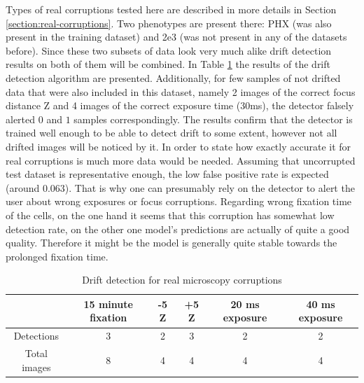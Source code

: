 Types of real corruptions tested here are described in more details in Section \ref{section:real-corruptions}. Two phenotypes are present there: PHX (was also present in the training dataset) and 2e3 (was not present in any of the datasets before). Since these two subsets of data look very much alike drift detection results on both of them will be combined. In Table \ref{table:real-corruptions-dd} the results of the drift detection algorithm are presented. Additionally, for few samples of not drifted data that were also included in this dataset, namely 2 images of the correct focus distance Z and 4 images of the correct exposure time (30ms), the detector falsely alerted $0$ and $1$ samples correspondingly. The results confirm that the detector is trained well enough to be able to detect drift to some extent, however not all drifted images will be noticed by it. In order to state how exactly accurate it for real corruptions is much more data would be needed. Assuming that uncorrupted test dataset is representative enough, the low false positive rate is expected (around $0.063$). That is why one can presumably rely on the detector to alert the user about wrong exposures or focus corruptions. Regarding wrong fixation time of the cells, on the one hand it seems that this corruption has somewhat low detection rate, on the other one model's predictions are actually of quite a good quality. Therefore it might be the model is generally quite stable towards the prolonged fixation time.

\begin{table}[htb]
    \centering
    \caption{Drift detection for real microscopy corruptions}
        \begin{adjustbox}{width=\textwidth}
            \begin{tabular}{|c||c|c|c|c|c|}\hline
				
                &15 minute fixation
                &-5 Z
                &+5 Z
                &20 ms exposure
                &40 ms exposure
                \\\hline\hline
            	Detections & 3 & 2 & 3 & 2 & 2\\\hline
                Total images & 8 & 4 & 4 & 4 & 4\\\hline
            \end{tabular}
        \end{adjustbox}
    \label{table:real-corruptions-dd}
\end{table}